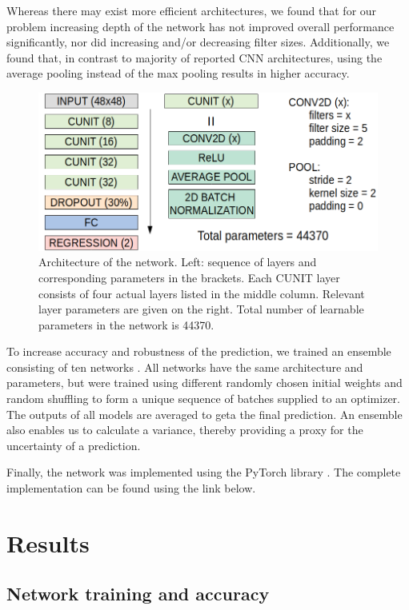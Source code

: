 \documentclass{svjour3}                     %
\begin{document}
Whereas there may exist more efficient architectures, we found that for our problem increasing depth of the network has not improved overall performance significantly, nor did increasing and/or decreasing filter sizes. Additionally, we found that, in contrast to majority of reported CNN architectures, using the average pooling instead of the max pooling results in higher accuracy.

\begin{figure}
\includegraphics[width=\textwidth]{figs/figure_CNN.png}
\caption{Architecture of the network. Left: sequence of layers and corresponding parameters in the brackets. Each CUNIT layer consists of four actual layers listed in the middle column. Relevant layer parameters are given on the right. Total number of learnable parameters in the network is 44370.}
\label{fig:figcnn}
\end{figure}

To increase accuracy and robustness of the prediction, we trained an ensemble consisting of ten networks \cite{hinton2015distilling}. All networks have the same architecture and parameters, but were trained using different randomly chosen initial weights \cite{glorot2010understanding, he2015delving} and random shuffling to form a unique sequence of batches supplied to an optimizer. The outputs of all models are averaged to geta the final prediction. An ensemble also enables us to calculate a variance, thereby providing a proxy for the uncertainty of a prediction.

Finally, the network was implemented using the PyTorch library \cite{paszke2017automatic}. The complete implementation can be found using the link below.

\section{Results}

\subsection{Network training and accuracy}
\end{document}
